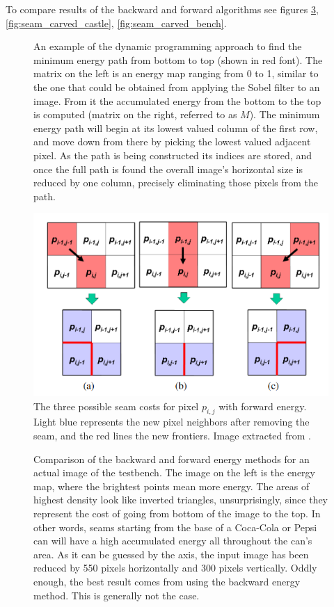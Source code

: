 \documentclass[../main.tex]{subfiles}
\begin{document}
To compare results of the backward and forward algorithms see figures \ref{fig:seam_carved_testbench_front}, \ref{fig:seam_carved_castle}, \ref{fig:seam_carved_bench}.
 

\begin{figure}[htbp]
    \centering
    \caption{An example of the dynamic programming approach to find the minimum energy path from bottom to top (shown in red font). The matrix on the left is an energy map ranging from 0 to 1, similar to the one that could be obtained from applying the Sobel filter to an image. From it the accumulated energy from the bottom to the top is computed (matrix on the right, referred to as $M$). The minimum energy path will begin at its lowest valued column of the first row, and move down from there by picking the lowest valued adjacent pixel. As the path is being constructed its indices are stored, and once the full path is found the overall image's horizontal size is reduced by one column, precisely eliminating those pixels from the path.}
    \label{fig:dynprog_example}
\end{figure}

\begin{figure}[htbp]
    \centering
    \includegraphics[width=0.6\linewidth]{images/forward_energy_diagram.png}
    \caption{The three possible seam costs for pixel $p_{i,j}$ with forward energy. Light blue represents the new pixel neighbors after removing the seam, and the red lines the new frontiers. Image extracted from \cite{seamcarving_improved}.}
    \label{fig:forward_energy_diagram}
\end{figure}

\begin{figure}[htbp]
    \centering
    \caption{Comparison of the backward and forward energy methods for an actual image of the testbench. The image on the left is the energy map, where the brightest points mean more energy. The areas of highest density look like inverted triangles, unsurprisingly, since they represent the cost of going from bottom of the image to the top. In other words, seams starting from the base of a Coca-Cola or Pepsi can will have a high accumulated energy all throughout the can's area. As it can be guessed by the axis, the input image has been reduced by 550 pixels horizontally and 300 pixels vertically. Oddly enough, the best result comes from using the backward energy method. This is generally not the case.}
    \label{fig:seam_carved_testbench_front}
\end{figure}
\end{document}
